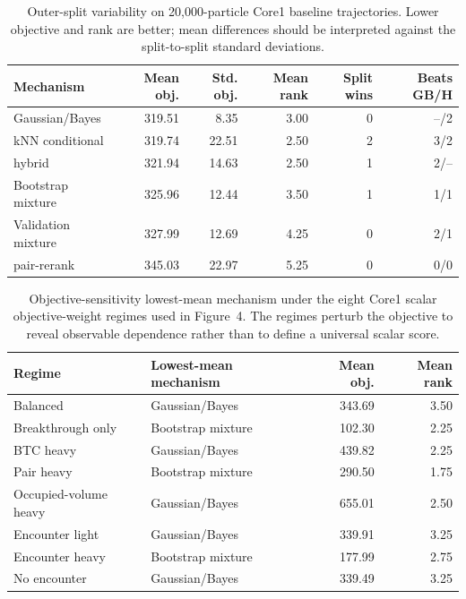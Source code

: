 \documentclass[11pt]{article}
\newcommand{\gb}{Gaussian/Bayes}
\newcommand{\knn}{kNN}
\newcommand{\hybrid}{hybrid}
\newcommand{\pair}{pair-rerank}
\begin{document}
\begin{table}[!htbp]
\centering
\caption{Outer-split variability on 20,000-particle Core1 baseline trajectories. Lower objective and rank are better; mean differences should be interpreted against the split-to-split standard deviations.}
\label{tab:Souter}
\small
\begin{tabular}{lrrrrr}
\toprule
Mechanism & Mean obj. & Std. obj. & Mean rank & Split wins & Beats GB/H \\
\midrule
\gb{} & 319.51 & 8.35 & 3.00 & 0 & --/2 \\
\knn{} conditional & 319.74 & 22.51 & 2.50 & 2 & 3/2 \\
\hybrid{} & 321.94 & 14.63 & 2.50 & 1 & 2/-- \\
Bootstrap mixture & 325.96 & 12.44 & 3.50 & 1 & 1/1 \\
Validation mixture & 327.99 & 12.69 & 4.25 & 0 & 2/1 \\
\pair{} & 345.03 & 22.97 & 5.25 & 0 & 0/0 \\
\bottomrule
\end{tabular}
\end{table}

\begin{table}[!htbp]
\centering
\caption{Objective-sensitivity lowest-mean mechanism under the eight Core1 scalar objective-weight regimes used in Figure~4. The regimes perturb the objective to reveal observable dependence rather than to define a universal scalar score.}
\label{tab:Sobjective}
\small
\begin{tabular}{llrr}
\toprule
Regime & Lowest-mean mechanism & Mean obj. & Mean rank \\
\midrule
Balanced & \gb{} & 343.69 & 3.50 \\
Breakthrough only & Bootstrap mixture & 102.30 & 2.25 \\
BTC heavy & \gb{} & 439.82 & 2.25 \\
Pair heavy & Bootstrap mixture & 290.50 & 1.75 \\
Occupied-volume heavy & \gb{} & 655.01 & 2.50 \\
Encounter light & \gb{} & 339.91 & 3.25 \\
Encounter heavy & Bootstrap mixture & 177.99 & 2.75 \\
No encounter & \gb{} & 339.49 & 3.25 \\
\bottomrule
\end{tabular}
\end{table}
\end{document}

